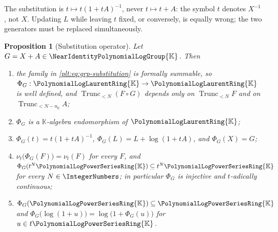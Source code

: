 \documentclass[11pt,oneside]{article}
\theoremstyle{plain}
\newtheorem{proposition}[theorem]{Proposition}
\theoremstyle{definition}
\theoremstyle{remark}
\newcommand{\K}{\mathbb{K}}
\newcommand{\PLpow}{\PolynomialLogPowerSeriesRing{\K}}   %
\newcommand{\PLlau}{\PolynomialLogLaurentRing{\K}}       %
\newcommand{\Gnear}{\NearIdentityPolynomialLogGroup{\K}} %
\newcommand{\ordt}{\nu_{t}}                              %
\newcommand{\Trunc}[2]{\operatorname{Trunc}_{<#2}#1}     %
\newcommand{\compose}{\mathbin{\circ}}
\begin{document}
\begin{warningbox}
The substitution is \(t\mapsto t(1+tA)^{-1}\), never \(t\mapsto t+A\): the
symbol \(t\) denotes \(X^{-1}\), not \(X\).  Updating \(L\) while leaving \(t\)
fixed, or conversely, is equally wrong; the two generators must be replaced
simultaneously.
\end{warningbox}

\begin{proposition}[Substitution operator]\label{plt:prop:grp-substitution}
Let \(G=X+A\in\Gnear\).  Then
\begin{enumerate}
\item the family in \eqref{plt:eq:grp-substitution} is formally summable, so
\(\Phi_G:\PLlau\to\PLlau\) is well defined, and
\(\Trunc{(F\compose G)}{N}\) depends only on
\(\Trunc{F}{N}\) and on \(\Trunc{A}{N-n_0}\);
\item \(\Phi_G\) is a \(\K\)-algebra endomorphism of \(\PLlau\);
\item \(\Phi_G(t)=t(1+tA)^{-1}\), \(\Phi_G(L)=L+\log(1+tA)\), and
\(\Phi_G(X)=G\);
\item \(\ordt\bigl(\Phi_G(F)\bigr)=\ordt(F)\) for every \(F\), and
\(\Phi_G(t^N\PLpow)\subseteq t^N\PLpow\) for every \(N\in\IntegerNumbers\);
in particular \(\Phi_G\) is injective and \(t\)-adically continuous;
\item \(\Phi_G(\PLpow)\subseteq\PLpow\) and
\(\Phi_G\bigl(\log(1+u)\bigr)=\log\bigl(1+\Phi_G(u)\bigr)\) for
\(u\in t\PLpow\).
\end{enumerate}
\end{proposition}
\end{document}

